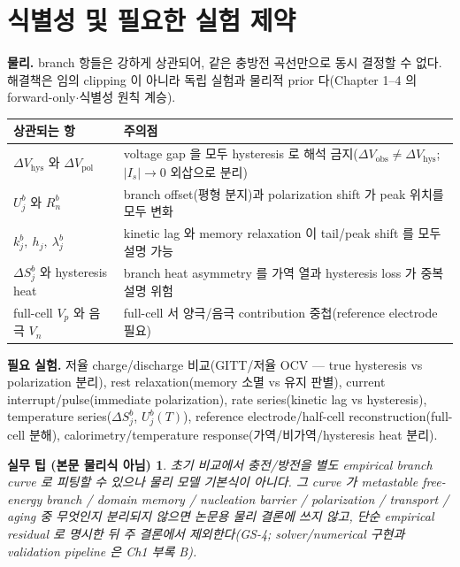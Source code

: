 \documentclass[11pt,a4paper]{article}
\newtheorem*{practicebox}{실무 팁 (본문 물리식 아님)}
\newcommand{\hys}{\mathrm{hys}}
\newcommand{\pol}{\mathrm{pol}}
\newcommand{\obs}{\mathrm{obs}}
\begin{document}
\section{식별성 및 필요한 실험 제약}\label{sec:ch5_ident}
\textbf{물리.} branch 항들은 강하게 상관되어, 같은 충방전 곡선만으로 동시 결정할 수 없다. 해결책은 임의
clipping 이 아니라 독립 실험과 물리적 prior 다(Chapter 1--4 의 forward-only$\cdot$식별성 원칙 계승).
\begin{longtable}{p{} >{\raggedright\arraybackslash}p{}}
\toprule 상관되는 항 & 주의점 \\ \midrule \endhead
$\Delta V_\hys$ 와 $\Delta V_\pol$ & voltage gap 을 모두 hysteresis 로 해석 금지($\Delta V_\obs\ne\Delta V_\hys$; $|I_s|\to0$ 외삽으로 분리) \\
$U_j^b$ 와 $R_n^b$ & branch offset(평형 분지)과 polarization shift 가 peak 위치를 모두 변화 \\
$k_j^b,\ h_j,\ \lambda_j^b$ & kinetic lag 와 memory relaxation 이 tail/peak shift 를 모두 설명 가능 \\
$\Delta S_j^b$ 와 hysteresis heat & branch heat asymmetry 를 가역 열과 hysteresis loss 가 중복 설명 위험 \\
full-cell $V_p$ 와 음극 $V_n$ & full-cell 서 양극/음극 contribution 중첩(reference electrode 필요) \\
\bottomrule
\end{longtable}
\textbf{필요 실험.} 저율 charge/discharge 비교(GITT/저율 OCV — true hysteresis vs polarization 분리), rest
relaxation(memory 소멸 vs 유지 판별), current interrupt/pulse(immediate polarization), rate series(kinetic
lag vs hysteresis), temperature series($\Delta S_j^b$, $U_j^b(T)$), reference electrode/half-cell
reconstruction(full-cell 분해), calorimetry/temperature response(가역/비가역/hysteresis heat 분리).
\begin{practicebox}
초기 비교에서 충전/방전을 별도 empirical branch curve 로 피팅할 수 있으나 \emph{물리 모델 기본식이 아니다}.
그 curve 가 metastable free-energy branch / domain memory / nucleation barrier / polarization / transport /
aging 중 무엇인지 분리되지 않으면 논문용 물리 결론에 쓰지 않고, 단순 empirical residual 로 명시한 뒤 주 결론에서
제외한다(GS-4; solver/numerical 구현과 validation pipeline 은 Ch1 부록 B).
\end{practicebox}

\end{document}
